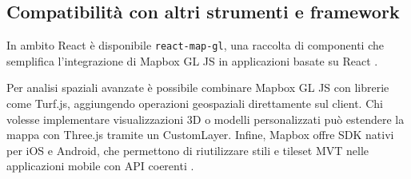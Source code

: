 \subsection{Compatibilità con altri strumenti e framework}
In ambito React è disponibile \texttt{react-map-gl}, una raccolta di componenti che
semplifica l'integrazione di Mapbox GL JS in applicazioni basate su React \cite{react-map-gl,mapbox-react-tutorial}.

Per analisi spaziali avanzate è possibile combinare Mapbox GL JS con librerie come
Turf.js, aggiungendo operazioni geospaziali direttamente sul client. Chi volesse
implementare visualizzazioni 3D o modelli personalizzati può estendere la mappa con
Three.js tramite un CustomLayer. Infine, Mapbox offre SDK nativi per iOS e Android,
che permettono di riutilizzare stili e tileset MVT nelle applicazioni mobile con
API coerenti \cite{mapbox-ios, mapbox-mobile-sdk}.

\newpage